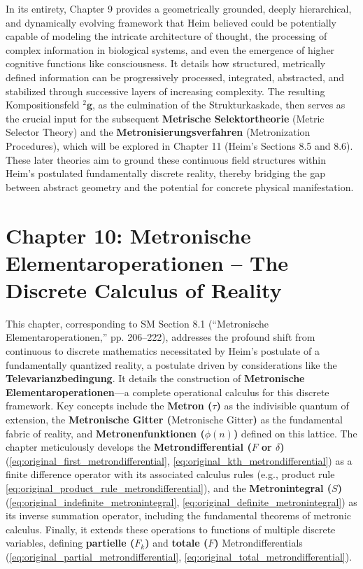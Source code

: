 \documentclass[12pt]{article}
\newcommand{\q}[1]{\enquote{#1}}
\newcommand{\kompositionsfeld}{{}^2\mathbf{g}}
\newcommand{\metron}{\tau}
\newcommand{\metronischegitter}{\text{Metronische Gitter}}
\newcommand{\metrondifferential}{F} %
\newcommand{\metronintegral}{S} %
\newcommand{\metronenfunktion}{\phi(n)}
\begin{document}
In its entirety, Chapter 9 provides a geometrically grounded, deeply hierarchical, and dynamically evolving framework that Heim believed could be potentially capable of modeling the intricate architecture of thought, the processing of complex information in biological systems, and even the emergence of higher cognitive functions like consciousness. It details how structured, metrically defined information can be progressively processed, integrated, abstracted, and stabilized through successive layers of increasing complexity. The resulting Kompositionsfeld \( \kompositionsfeld \), as the culmination of the Strukturkaskade, then serves as the crucial input for the subsequent \textbf{Metrische Selektortheorie} (Metric Selector Theory) and the \textbf{Metronisierungsverfahren} (Metronization Procedures), which will be explored in Chapter 11 (Heim's Sections 8.5 and 8.6). These later theories aim to ground these continuous field structures within Heim’s postulated fundamentally discrete reality, thereby bridging the gap between abstract geometry and the potential for concrete physical manifestation.

\clearpage 
\section{Chapter 10: Metronische Elementaroperationen – The Discrete Calculus of Reality}
\label{sec:chapter10}

This chapter, corresponding to SM Section 8.1 (\q{Metronische Elementaroperationen,} pp. 206–222), addresses the profound shift from continuous to discrete mathematics necessitated by Heim's postulate of a fundamentally quantized reality, a postulate driven by considerations like the \textbf{Televarianzbedingung}. It details the construction of \textbf{Metronische Elementaroperationen}—a complete operational calculus for this discrete framework. Key concepts include the \textbf{Metron (\(\metron\))} as the indivisible quantum of extension, the \textbf{Metronische Gitter (\(\metronischegitter\))} as the fundamental fabric of reality, and \textbf{Metronenfunktionen (\(\metronenfunktion\))} defined on this lattice. The chapter meticulously develops the \textbf{Metrondifferential (\(\metrondifferential\) or \( \delta \))} (\eqref{eq:original_first_metrondifferential}, \eqref{eq:original_kth_metrondifferential}) as a finite difference operator with its associated calculus rules (e.g., product rule \eqref{eq:original_product_rule_metrondifferential}), and the \textbf{Metronintegral (\(\metronintegral\))} (\eqref{eq:original_indefinite_metronintegral}, \eqref{eq:original_definite_metronintegral}) as its inverse summation operator, including the fundamental theorems of metronic calculus. Finally, it extends these operations to functions of multiple discrete variables, defining \textbf{partielle (\(F_k\))} and \textbf{totale (\(F\))} Metrondifferentials (\eqref{eq:original_partial_metrondifferential}, \eqref{eq:original_total_metrondifferential}).
\end{document}
